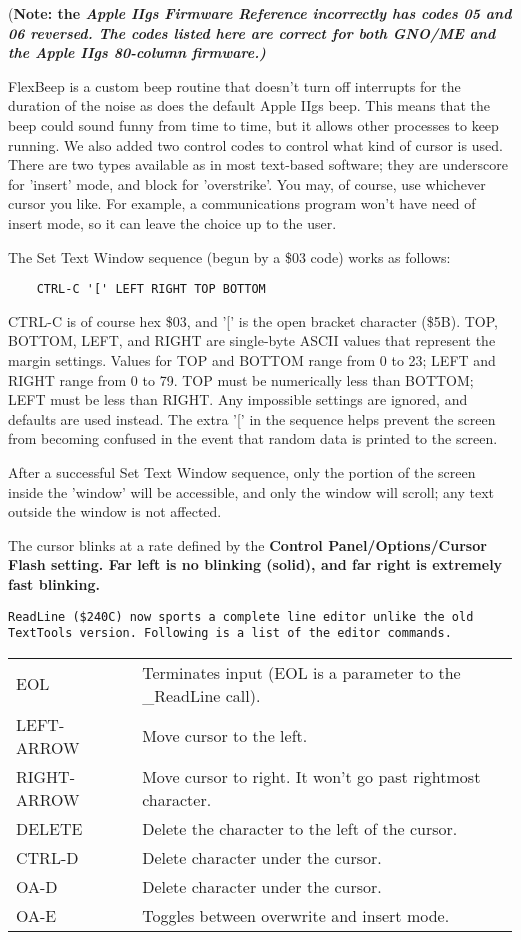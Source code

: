 \documentclass{report}
\begin{document}
(\bf Note\rm: the \it Apple IIgs Firmware Reference \rm
incorrectly has codes 05 and 06 reversed. The codes listed here
are correct for both GNO/ME and the Apple IIgs 80-column
firmware.)

FlexBeep is a custom beep routine that
doesn't turn off interrupts for the duration of the noise as does
the default Apple IIgs beep. This means that the beep could sound
funny from time to time, but it allows other processes to keep
running. We also added two control codes to control what kind of
cursor is used. There are two types available as in most
text-based software; they are underscore for 'insert' mode, and
block for 'overstrike'. You may, of course, use whichever cursor
you like. For example, a communications program won't have need
of insert mode, so it can leave the choice up to the user.



The Set Text Window sequence (begun by a \$03 code) works as follows:

\begin{verbatim}
    CTRL-C '[' LEFT RIGHT TOP BOTTOM
\end{verbatim}

CTRL-C is of course hex \$03, and '[' is the
open bracket character (\$5B). TOP, BOTTOM, LEFT, and RIGHT are
single-byte ASCII values that represent the margin settings.
Values for TOP and BOTTOM range from 0 to 23; LEFT and RIGHT
range from 0 to 79. TOP must be numerically less than BOTTOM;
LEFT must be less than RIGHT. Any impossible settings are
ignored, and defaults are used instead. The extra '[' in the
sequence helps prevent the screen from becoming confused in the
event that random data is printed to the screen.

After a successful Set Text Window
sequence, only the portion of the screen inside the 'window' will
be accessible, and only the window will scroll; any text outside
the window is not affected.

The cursor blinks at a rate defined by the 
\bf Control Panel/Options/Cursor Flash \rm setting. Far left is no blinking
(solid), and far right is extremely fast blinking.

\tt ReadLine \rm (\$240C) now sports a complete line editor unlike the old
TextTools version. Following is a list of the editor commands.

\begin{tabular}{ll}
\index{\^{}D}
EOL 	    & Terminates input (EOL is a parameter to the \_{}ReadLine call). \\
LEFT-ARROW  & Move cursor to the left. \\
RIGHT-ARROW & Move cursor to right. It won't go past rightmost character. \\
DELETE      & Delete the character to the left of the cursor. \\
CTRL-D      & Delete character under the cursor. \\
OA-D        & Delete character under the cursor. \\
OA-E        & Toggles between overwrite and insert mode. \\
\end{tabular}
\end{document}
